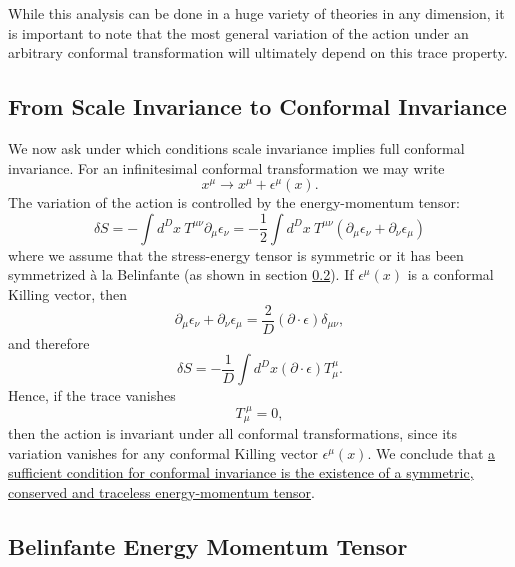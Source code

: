 While this analysis can be done in a huge variety of theories in any dimension, it is important to note that the most general variation of the action under an arbitrary conformal transformation will ultimately depend on this trace property.

\subsection{From Scale Invariance to Conformal Invariance}

We now ask under which conditions scale invariance implies full conformal invariance.
For an infinitesimal conformal transformation we may write
\[
    x^{\mu}\rightarrow x^{\mu}+\epsilon^{\mu}(x).
\]
The variation of the action is controlled by the energy-momentum tensor:
\[
    \delta S=-\int d^{D}x~T^{\mu\nu}\partial_{\mu}\epsilon_{\nu}=-\frac{1}{2}\int d^{D}x~T^{\mu\nu}(\partial_{\mu}\epsilon_{\nu}+\partial_{\nu}\epsilon_{\mu})
\]
where we assume that the stress-energy tensor is symmetric or it has been symmetrized \`a la Belinfante (as shown in section \ref{sec:Belinfante_energy_momentum_tensor}). If \(\epsilon^{\mu}(x)\) is a conformal Killing vector, then
\[
    \partial_{\mu}\epsilon_{\nu}+\partial_{\nu}\epsilon_{\mu}=\frac{2}{D}(\partial\cdot\epsilon)\delta_{\mu\nu},
\]
and therefore
\[
    \delta S=-\frac{1}{D}\int d^{D}x(\partial\cdot\epsilon)T_{\mu}^{\mu}.
\]
Hence, if the trace vanishes
\[
    T_{\mu}^{\ \mu}=0,
\]
then the action is invariant under all conformal transformations, since its variation vanishes for any conformal Killing vector \(\epsilon^{\mu}(x)\). We conclude that \uline{a sufficient condition for conformal invariance is the existence of a symmetric, conserved and traceless energy-momentum tensor}.

\subsection{Belinfante Energy Momentum Tensor}\label{sec:Belinfante_energy_momentum_tensor}

